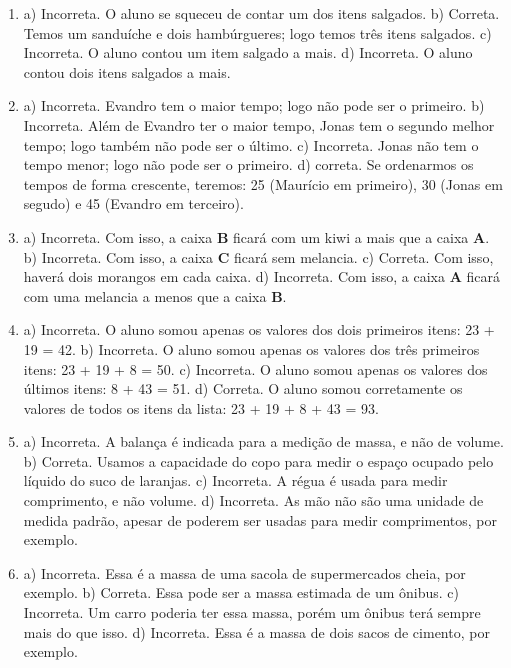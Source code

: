 
\begin{enumerate}
\item
a) Incorreta. O aluno se squeceu de contar um dos itens salgados.
b) Correta. Temos um sanduíche e dois hambúrgueres; logo temos três
itens salgados.
c) Incorreta. O aluno contou um item salgado a mais.
d) Incorreta. O aluno contou dois itens salgados a mais.

\item
a) Incorreta. Evandro tem o maior tempo; logo não pode ser o primeiro.
b) Incorreta. Além de Evandro ter o maior tempo, Jonas tem o segundo
melhor tempo; logo também não pode ser o último.
c) Incorreta. Jonas não tem o tempo menor; logo não pode ser o
primeiro.
d) correta. Se ordenarmos os tempos de forma crescente, teremos: 25 (Maurício em primeiro),
30 (Jonas em segudo) e 45 (Evandro em terceiro).

\item
a) Incorreta. Com isso, a caixa \textbf{B} ficará com um kiwi a mais que a caixa \textbf{A}.
b) Incorreta. Com isso, a caixa \textbf{C} ficará sem melancia.
c) Correta. Com isso, haverá dois morangos em cada caixa.
d) Incorreta. Com isso, a caixa \textbf{A} ficará com uma melancia a menos que a
caixa \textbf{B}.

\item
a) Incorreta. O aluno somou apenas os valores dos dois primeiros itens: 23 + 19 = 42.
b) Incorreta. O aluno somou apenas os valores dos três primeiros itens: 23 + 19 + 8 = 50.
c) Incorreta. O aluno somou apenas os valores dos últimos itens: 8 + 43 = 51.
d) Correta. O aluno somou corretamente os valores de todos os itens da lista: 23 + 19 + 8 + 43 = 93.

\item
a) Incorreta. A balança é indicada para a medição de massa, e não de volume.
b) Correta. Usamos a capacidade do copo para medir o espaço ocupado pelo
líquido do suco de laranjas.
c) Incorreta. A régua é usada para medir comprimento, e não volume.
d) Incorreta. As mão não são uma unidade de medida padrão, apesar de poderem ser
usadas para medir comprimentos, por exemplo.

\item
a) Incorreta. Essa é a massa de uma sacola de supermercados
cheia, por exemplo.
b) Correta. Essa pode ser a massa estimada de um ônibus.
c) Incorreta. Um carro poderia ter essa massa, porém um ônibus terá sempre
mais do que isso.
d) Incorreta. Essa é a massa de dois sacos de cimento, por exemplo.


\end{enumerate}
